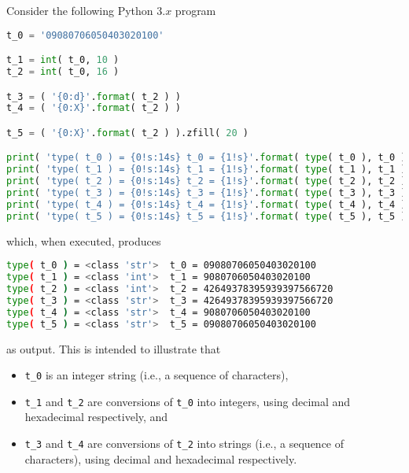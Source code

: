 %


Consider the following Python $3.x$ program
 
\begin{lstlisting}[language={Python},frame={single},basicstyle={\ttfamily\small}]
t_0 = '09080706050403020100'

t_1 = int( t_0, 10 )
t_2 = int( t_0, 16 )

t_3 = ( '{0:d}'.format( t_2 ) )
t_4 = ( '{0:X}'.format( t_2 ) )

t_5 = ( '{0:X}'.format( t_2 ) ).zfill( 20 )

print( 'type( t_0 ) = {0!s:14s} t_0 = {1!s}'.format( type( t_0 ), t_0 ) )
print( 'type( t_1 ) = {0!s:14s} t_1 = {1!s}'.format( type( t_1 ), t_1 ) )
print( 'type( t_2 ) = {0!s:14s} t_2 = {1!s}'.format( type( t_2 ), t_2 ) )
print( 'type( t_3 ) = {0!s:14s} t_3 = {1!s}'.format( type( t_3 ), t_3 ) )
print( 'type( t_4 ) = {0!s:14s} t_4 = {1!s}'.format( type( t_4 ), t_4 ) )
print( 'type( t_5 ) = {0!s:14s} t_5 = {1!s}'.format( type( t_5 ), t_5 ) )
\end{lstlisting}
 
\noindent
which, when executed, produces

\begin{lstlisting}[language={bash},  frame={single},basicstyle={\ttfamily\small}] 
type( t_0 ) = <class 'str'>  t_0 = 09080706050403020100
type( t_1 ) = <class 'int'>  t_1 = 9080706050403020100
type( t_2 ) = <class 'int'>  t_2 = 42649378395939397566720
type( t_3 ) = <class 'str'>  t_3 = 42649378395939397566720
type( t_4 ) = <class 'str'>  t_4 = 9080706050403020100
type( t_5 ) = <class 'str'>  t_5 = 09080706050403020100
\end{lstlisting}

\noindent
as output.  This is intended to illustrate that
 
\begin{itemize}
\item \lstinline[language={Python}]|t_0| is an
      integer string
      (i.e., a sequence of characters),
\item \lstinline[language={Python}]|t_1| 
      and 
      \lstinline[language={Python}]|t_2|
      are conversions of 
      \lstinline[language={Python}]|t_0| 
      into
      integers,
      using decimal and hexadecimal respectively,
      and
\item \lstinline[language={Python}]|t_3| 
      and
      \lstinline[language={Python}]|t_4|
      are conversions of 
      \lstinline[language={Python}]|t_2| 
      into
      strings
      (i.e., a sequence of characters),
      using decimal and hexadecimal respectively.
\end{itemize}
 
